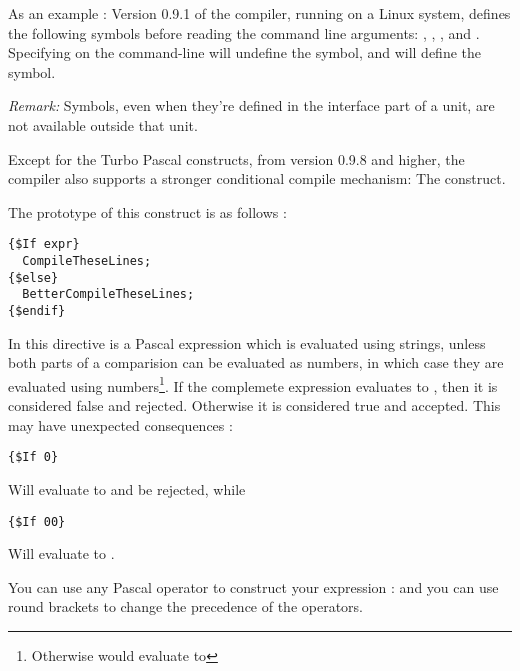 \documentclass{report}
\begin{document}
As an example : Version 0.9.1 of the compiler, running on a Linux system,
defines the following symbols before reading the command line arguments:
, , ,  and .
Specifying  on the command-line will undefine the 
symbol, and will define the  symbol. 

{\em Remark: } Symbols, even when they're defined in the interface part of 
a unit, are not available outside that unit.


Except for the Turbo Pascal constructs, from version 0.9.8 and higher,
the \fpc compiler also supports a stronger conditional compile mechanism:
The  construct. 

The prototype of this construct is as follows :
\begin{verbatim}
{$If expr}
  CompileTheseLines;
{$else}
  BetterCompileTheseLines;
{$endif}
\end{verbatim}
In this directive  is a Pascal expression which is evaluated using
strings, unless both parts of a comparision can be evaluated as numbers, 
in which case they are evaluated using numbers\footnote{Otherwise
 would evaluate to }.
If the complemete expression evaluates to , then it is considered 
false and rejected. Otherwise it is considered true and accepted. This may
have unexpected consequences :
\begin{verbatim}
{$If 0}
\end{verbatim}
Will evaluate to  and be rejected, while
\begin{verbatim}
{$If 00}
\end{verbatim}
Will evaluate to .

You can use any Pascal operator to construct your expression :  and you can use round brackets to change the
precedence of the operators.
\end{document}
